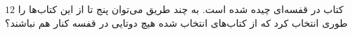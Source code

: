     \p 
$12$
کتاب در قفسه‌ای چیده شده است. به چند طریق می‌توان پنج تا از این کتاب‌ها را طوری انتخاب کرد که از کتاب‌های انتخاب شده هیچ دوتایی در قفسه کنار هم نباشند؟